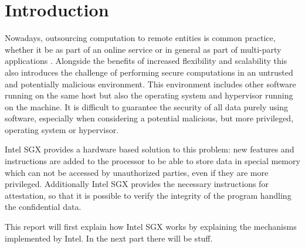 \section{Introduction} \label{sec:introduction}
Nowadays, outsourcing computation to remote entities is common practice, whether it be as part of an online service or 
in general as part of multi-party applications \cite{UseOfIntelSGX}. 
Alongside the benefits of increased flexibility and scalability this also introduces the challenge of performing secure 
computations in an untrusted and potentially malicious environment. 
This environment includes other software running on the same host but also the operating system and hypervisor running
on the machine.
It is difficult to guarantee the security of all data purely using software, especially when considering a potential 
malicious, but more privileged, operating system or hypervisor.

Intel SGX provides a hardware based solution to this problem: new features and instructions are added to the processor
to be able to store data in special memory which can not be accessed by unauthorized parties, even if they are more
privileged. Additionally Intel SGX provides the necessary instructions for attestation, so that it is possible to
verify the integrity of the program handling the confidential data.

This report will first explain how Intel SGX works by explaining the mechanisms implemented by Intel. In the next
part there will be stuff.
